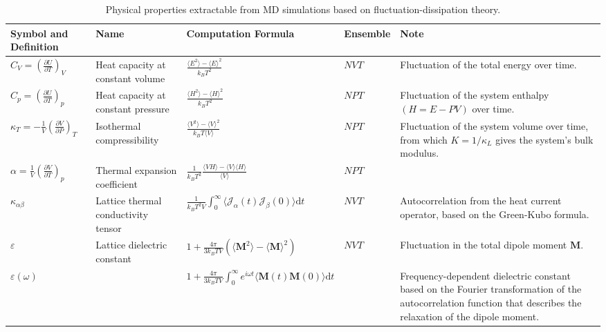 \begin{table}[tbh]
    \centering
    \footnotesize
\caption{Physical properties extractable from MD simulations based on fluctuation-dissipation theory.}
\label{tab:properties_from_MD}
    \begin{tabular}{p{2.8cm}p{2.5cm}llp{4cm}}
    \hline\hline
      \textbf{Symbol and Definition}   & \textbf{Name} & \textbf{Computation Formula} & \textbf{Ensemble}& \textbf{Note} \\ \hline
        $\displaystyle{C_{V}=\left(\frac{\partial U}{\partial T}\right)_V}$ & Heat capacity at constant volume & $\displaystyle{\frac{\langle E^2\rangle-\langle E\rangle^2}{k_B T^2}}$ & $NVT$ & Fluctuation of the total energy over time.\\
        $\displaystyle{C_{p}=\left(\frac{\partial U}{\partial T}\right)_p}$ & Heat capacity at constant pressure & $\displaystyle{\frac{\langle H^2\rangle-\langle H\rangle^2}{k_B T^2}}$ & $NPT$ & Fluctuation of the system enthalpy $(H=E-PV)$ over time.\\
        $\displaystyle{\kappa_T=-\frac{1}{V}\left( \frac{\partial V}{\partial P}\right)_T}$ & Isothermal compressibility & $\displaystyle{\frac{\langle V^2\rangle - \langle V\rangle^2}{k_B T \langle V\rangle} }$ & $NPT$& Fluctuation of the system volume over time, from which $K=1/\kappa_L$ gives the system's bulk modulus.\\
        $\displaystyle{\alpha=\frac{1}{V}\left(\frac{\partial V}{\partial T} \right)_p}$ & Thermal expansion coefficient & $\displaystyle{\frac{1}{k_B T^2}\frac{\langle VH\rangle-\langle V\rangle\langle H\rangle}{\langle V\rangle}}$ & $NPT$ & \\
        $\kappa_{\alpha\beta}$ & Lattice thermal conductivity tensor & $\displaystyle{\frac{1}{k_B T^2 V}}\int_0^\infty \langle \mathcal{J}_{\alpha}(t)\mathcal{J}_{\beta}(0)\rangle \mbox{d}t$ &$NVT$& Autocorrelation from the heat current operator, based on the Green-Kubo formula.\\
        $\varepsilon$ & Lattice dielectric constant & $\displaystyle{1+\frac{4\pi}{3k_B TV}\left(\langle \bm{M}^2\rangle-\langle\bm{M}\rangle^2\right) }$ & $NVT$& Fluctuation in the total dipole moment $\bm{M}$.\\
        $\varepsilon(\omega)$ & & $\displaystyle{1+\frac{4\pi}{3k_B TV}\int^\infty_0 e^{i\omega t}}\langle\bm{M}(t)\bm{M}(0)\rangle \mbox{d}t$ & & Frequency-dependent dielectric constant based on the Fourier transformation of the autocorrelation function that describes the relaxation of the dipole moment. \\

\end{tabular}
\end{table}
